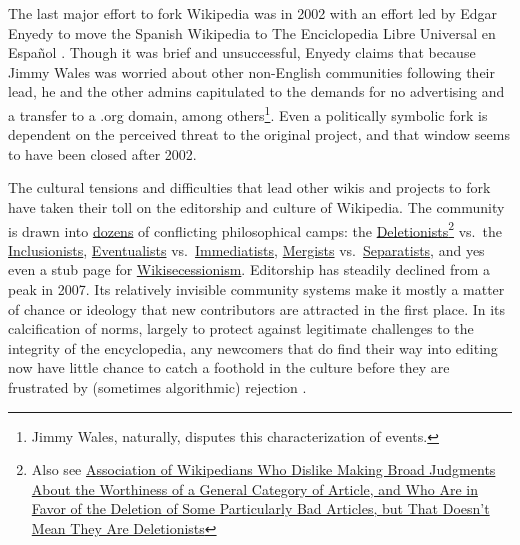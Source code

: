 \documentclass[10pt]{tufte-book}
\begin{document}
The last major effort to fork Wikipedia was in 2002 with an effort led
by Edgar Enyedy to move the Spanish Wikipedia to The Enciclopedia Libre
Universal en Español \citep{tkaczSpanishForkWikipedia2011, tkaczWikipediaPoliticsOpenness2014} . Though it was brief and
unsuccessful, Enyedy claims that because Jimmy Wales was worried about
other non-English communities following their lead, he and the other
admins capitulated to the demands for no advertising and a transfer to a
.org domain, among others\footnote{Jimmy Wales, naturally, disputes this
  characterization of events.}. Even a politically symbolic fork is
dependent on the perceived threat to the original project, and that
window seems to have been closed after 2002.

The cultural tensions and difficulties that lead other wikis and
projects to fork have taken their toll on the editorship and culture of
Wikipedia. The community is drawn into
\href{https://meta.wikimedia.org/wiki/Conflicting_Wikipedia_philosophies}{dozens}
of conflicting philosophical camps: the
\href{https://meta.wikimedia.org/wiki/Special:MyLanguage/Deletionism}{Deletionists}\footnote{Also
  see
  \href{https://meta.wikimedia.org/wiki/Association_of_Wikipedians_Who_Dislike_Making_Broad_Judgments_About_the_Worthiness_of_a_General_Category_of_Article,_and_Who_Are_in_Favor_of_the_Deletion_of_Some_Particularly_Bad_Articles,_but_That_Doesn\%27t_Mean_They_Are_Deletionists}{Association
  of Wikipedians Who Dislike Making Broad Judgments About the Worthiness
  of a General Category of Article, and Who Are in Favor of the Deletion
  of Some Particularly Bad Articles, but That Doesn't Mean They Are
  Deletionists}} vs.~the
\href{https://meta.wikimedia.org/wiki/Special:MyLanguage/Inclusionism}{Inclusionists},
\href{https://meta.wikimedia.org/wiki/Eventualism}{Eventualists}
vs.~\href{https://meta.wikimedia.org/wiki/Immediatism}{Immediatists},
\href{https://meta.wikimedia.org/wiki/Special:MyLanguage/Mergism}{Mergists}
vs.~\href{https://meta.wikimedia.org/wiki/Special:MyLanguage/Separatism}{Separatists},
and yes even a stub page for
\href{https://meta.wikimedia.org/wiki/Wikisecessionism}{Wikisecessionism}.
Editorship has steadily declined from a peak in 2007. Its relatively
invisible community systems make it mostly a matter of chance or
ideology that new contributors are attracted in the first place. In its
calcification of norms, largely to protect against legitimate challenges
to the integrity of the encyclopedia, any newcomers that do find their
way into editing now have little chance to catch a foothold in the
culture before they are frustrated by (sometimes algorithmic) rejection
\citep{hillWikipediaEndOpen2019, halfakerRiseDeclineOpen2013} .
\end{document}
